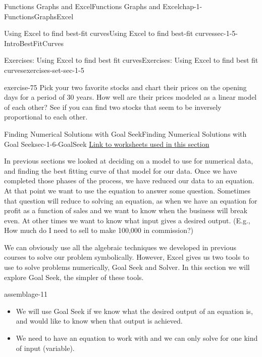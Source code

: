 \documentclass[oneside,10pt,]{book}
\numberwithin{equation}{section}
\begin{document}
\begin{chapterptx}{Functions Graphs and Excel}{}{Functions Graphs and Excel}{}{}{chap-1-FunctionsGraphsExcel}
\begin{sectionptx}{Using Excel to find best-fit curves}{}{Using Excel to find best-fit curves}{}{}{sec-1-5-IntroBestFitCurves}
\begin{exercises-subsection-numberless}{Exercises: Using Excel to find best fit curves}{}{Exercises: Using Excel to find best fit curves}{}{}{exercises-set-sec-1-5}
\begin{divisionexercise}{11}{}{}{exercise-75}%
\hypertarget{p-463}{}%
Pick your two favorite stocks and chart their prices on the opening days for a period of 30 years.  How well are their prices modeled as a linear model of each other?  See if you can find two stocks that seem to be inversely proportional to each other.%
\end{divisionexercise}%
\end{exercises-subsection-numberless}
\end{sectionptx}
%
%
\typeout{************************************************}
\typeout{************************************************}
%
\begin{sectionptx}{Finding Numerical Solutions with Goal Seek}{}{Finding Numerical Solutions with Goal Seek}{}{}{sec-1-6-GoalSeek}
\hypertarget{p-464}{}%
\href{./Examples/Section-1-6-Examples.xlsx}{Link to worksheets used in this section}%
\par
\hypertarget{p-465}{}%
In previous sections we looked at deciding on a model to use for numerical data, and finding the best fitting curve of that model for our data.  Once we have completed those phases of the process, we have reduced our data to an equation.  At that point we want to use the equation to answer some question.  Sometimes that question will reduce to solving an equation, as when we have an equation for profit as a function of sales and we want to know when the business will break even.  At other times we want to know what input gives a desired output.  (E.g., How much do I need to sell to make \textdollar{}100,000 in commission?)%
\par
\hypertarget{p-466}{}%
We can obviously use all the algebraic techniques we developed in previous courses to solve our problem symbolically.  However, Excel gives us two tools to use to solve problems numerically, Goal Seek and Solver.  In this section we will explore Goal Seek, the simpler of these tools.%
\begin{assemblage}{}{assemblage-11}%
\hypertarget{p-467}{}%
\leavevmode%
\begin{itemize}[label=\textbullet]
\item{}\hypertarget{p-468}{}%
We will use Goal Seek if we know what the desired output of an equation is, and would like to know when that output is achieved.%
\item{}\hypertarget{p-469}{}%
We need to have an equation to work with and we can only solve for one kind of input (variable).%

\end{itemize}
\end{assemblage}
\end{sectionptx}
\end{chapterptx}
\end{document}
